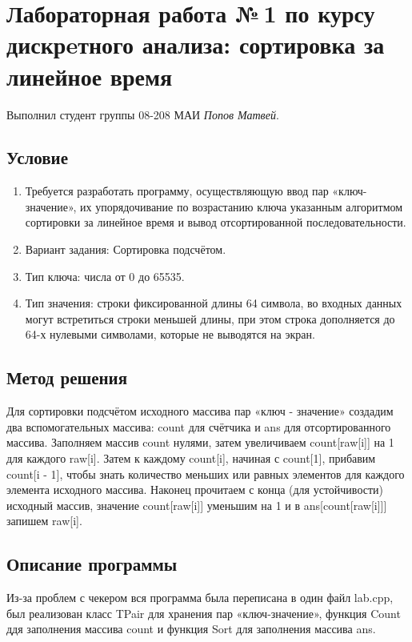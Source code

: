 \documentclass[12pt]{article}
\begin{document}
\section*{Лабораторная работа №\,1 по курсу дискрeтного анализа: сортировка за линейное время}

Выполнил студент группы 08-208 МАИ \textit{Попов Матвей}.

\subsection*{Условие}

\begin{enumerate}
\item Требуется разработать программу, осуществляющую ввод пар «ключ-значение», их упорядочивание по возрастанию ключа указанным алгоритмом сортировки за линейное время и вывод отсортированной последовательности.
\item Вариант задания: Сортировка подсчётом.
\item Тип ключа: числа от 0 до 65535.
\item Тип значения: строки фиксированной длины 64 символа, во входных данных могут встретиться строки меньшей длины, при этом строка дополняется до 64-х нулевыми символами, которые не выводятся на экран. 
\end{enumerate}

\subsection*{Метод решения}

Для сортировки подсчётом исходного массива пар «ключ - значение» создадим два вспомогательных массива: count для счётчика и ans для отсортированного массива.
Заполняем массив count нулями, затем увеличиваем count[raw[i]] на 1 для каждого raw[i]. 
Затем к каждому count[i], начиная с count[1], прибавим count[i - 1], чтобы знать количество меньших или равных элементов для каждого элемента исходного массива.
Наконец прочитаем с конца (для устойчивости) исходный массив, значение count[raw[i]] уменьшим на 1 и в ans[count[raw[i]]] запишем raw[i].  

\subsection*{Описание программы}

Из-за проблем с чекером вся программа была переписана в один файл lab.cpp, был реализован класс TPair для хранения пар «ключ-значение», функция Count ддя заполнения массива count и функция Sort для заполнения массива ans.
\end{document}
